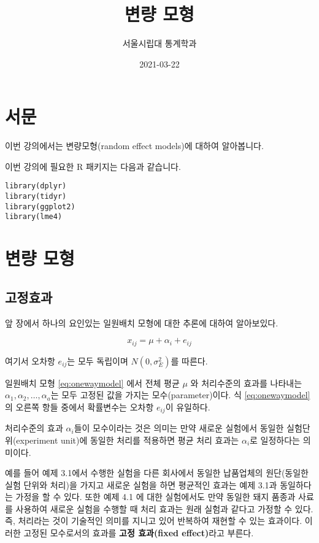 \documentclass[
]{book}
\title{변량 모형}
\author{서울시립대 통계학과}
\date{2021-03-22}
\theoremstyle{definition}
\theoremstyle{definition}
\theoremstyle{definition}
\theoremstyle{remark}
\begin{document}
\maketitle

{
\setcounter{tocdepth}{1}
\tableofcontents
}
\hypertarget{uxc11cuxbb38}{%
\chapter*{서문}\label{uxc11cuxbb38}}


이번 강의에서는 변량모형(random effect models)에 대하여 알아봅니다.

이번 강의에 필요한 R 패키지는 다음과 같습니다.

\begin{verbatim}
library(dplyr)
library(tidyr)
library(ggplot2)
library(lme4)
\end{verbatim}

\mainmatter

\hypertarget{intro}{%
\chapter{변량 모형}\label{intro}}

\hypertarget{uxace0uxc815uxd6a8uxacfc}{%
\section{고정효과}\label{uxace0uxc815uxd6a8uxacfc}}

앞 장에서 하나의 요인있는 일원배치 모형에 대한 추론에 대하여 알아보있다.

\begin{equation}
x_{ij} = \mu + \alpha_i + e_{ij}
\label{eq:onewaymodel}
\end{equation}

여기서 오차항 \(e_{ij}\)는 모두 독립이며 \(N(0,\sigma_E^2)\)를 따른다.

일원배치 모형 \eqref{eq:onewaymodel} 에서 전체 평균 \(\mu\) 와 처리수준의 효과를 나타내는 \(\alpha_1, \alpha_2, \dots, \alpha_a\)는 모두 고정된 값을 가지는 모수(parameter)이다. 식 \eqref{eq:onewaymodel} 의 오른쪽 항들 중에서 확률변수는 오차항 \(e_{ij}\)이 유일하다.

처리수준의 효과 \(\alpha_i\)들이 모수이라는 것은 의미는 만약 새로운 실험에서 동일한 실험단위(experiment unit)에 동일한 처리를 적용하면 평균 처리 효과는 \(\alpha_i\)로 일정하다는 의미이다.

예를 들어 예제 3.1에서 수행한 실험을 다른 회사에서 동일한 납품업체의 원단(동일한 실험 단위와 처리)을 가지고 새로운 실험을 하면 평균적인 효과는 예제 3.1과 동일하다는 가정을 할 수 있다. 또한 예제 4.1 에 대한 실험에서도 만약 동일한 돼지 품종과 사료를 사용하여 새로운 실험을 수행할 때 처리 효과는 원래 실험과 같다고 가정할 수 있다. 즉, 처리라는 것이 기술적인 의미를 지니고 있어 반복하여 재현할 수 있는 효과이다. 이러한 고정된 모수로서의 효과를 \textbf{고정 효과(fixed effect)}라고 부른다.
\end{document}
